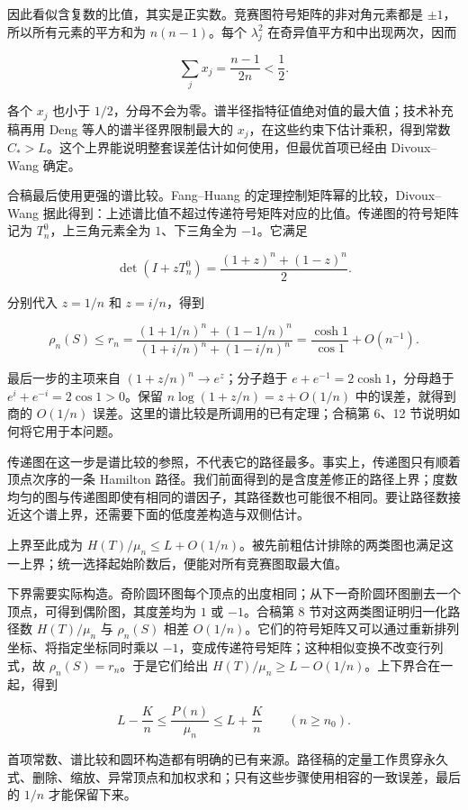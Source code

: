 \documentclass[11pt,a4paper]{article}
\begin{document}
因此看似含复数的比值，其实是正实数。竞赛图符号矩阵的非对角元素都是 \(\pm1\)，所以所有元素的平方和为 \(n(n-1)\)。每个 \(\lambda_j^2\) 在奇异值平方和中出现两次，因而

\[\sum_jx_j=\frac{n-1}{2n}<\frac12.\]

各个 \(x_j\) 也小于 \(1/2\)，分母不会为零。谱半径指特征值绝对值的最大值；技术补充稿再用 Deng 等人的谱半径界限制最大的 \(x_j\)，在这些约束下估计乘积，得到常数 \(C_*>L\)。这个上界能说明整套误差估计如何使用，但最优首项已经由 Divoux--Wang 确定。

合稿最后使用更强的谱比较。Fang--Huang 的定理控制矩阵幂的比较，Divoux--Wang 据此得到：上述谱比值不超过传递符号矩阵对应的比值。传递图的符号矩阵记为 \(T_n^0\)，上三角元素全为 \(1\)、下三角全为 \(-1\)。它满足

\[\det(I+zT_n^0)=\frac{(1+z)^n+(1-z)^n}{2}.\]

分别代入 \(z=1/n\) 和 \(z=i/n\)，得到

\[\rho_n(S)\le r_n
=\frac{(1+1/n)^n+(1-1/n)^n}
{(1+i/n)^n+(1-i/n)^n}
=\frac{\cosh1}{\cos1}+O(n^{-1}).\]

最后一步的主项来自 \((1+z/n)^n\to e^z\)；分子趋于 \(e+e^{-1}=2\cosh1\)，分母趋于 \(e^i+e^{-i}=2\cos1>0\)。保留 \(n\log(1+z/n)=z+O(1/n)\) 中的误差，就得到商的 \(O(1/n)\) 误差。这里的谱比较是所调用的已有定理；合稿第 6、12 节说明如何将它用于本问题。

传递图在这一步是谱比较的参照，不代表它的路径最多。事实上，传递图只有顺着顶点次序的一条 Hamilton 路径。我们前面得到的是含度差修正的路径上界；度数均匀的图与传递图即使有相同的谱因子，其路径数也可能很不相同。要让路径数接近这个谱上界，还需要下面的低度差构造与双侧估计。

上界至此成为 \(H(T)/\mu_n\le L+O(1/n)\)。被先前粗估计排除的两类图也满足这一上界；统一选择起始阶数后，便能对所有竞赛图取最大值。

下界需要实际构造。奇阶圆环图每个顶点的出度相同；从下一奇阶圆环图删去一个顶点，可得到偶阶图，其度差均为 \(1\) 或 \(-1\)。合稿第 8 节对这两类图证明归一化路径数 \(H(T)/\mu_n\) 与 \(\rho_n(S)\) 相差 \(O(1/n)\)。它们的符号矩阵又可以通过重新排列坐标、将指定坐标同时乘以 \(-1\)，变成传递符号矩阵；这种相似变换不改变行列式，故 \(\rho_n(S)=r_n\)。于是它们给出 \(H(T)/\mu_n\ge L-O(1/n)\)。上下界合在一起，得到

\[L-\frac Kn\le\frac{P(n)}{\mu_n}\le L+\frac Kn
\qquad(n\ge n_0).\]

首项常数、谱比较和圆环构造都有明确的已有来源。路径稿的定量工作贯穿永久式、删除、缩放、异常顶点和加权求和；只有这些步骤使用相容的一致误差，最后的 \(1/n\) 才能保留下来。
\end{document}
